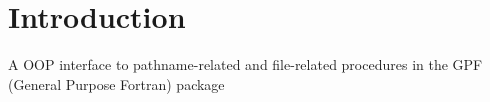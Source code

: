     

    \hypertarget{index_Introduction}{}\section{Introduction}\label{index_Introduction}
A O\+OP interface to pathname-\/related and file-\/related procedures in the G\+PF (General Purpose Fortran) package

      